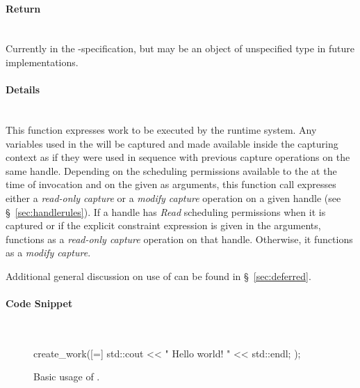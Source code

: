 \paragraph{Return}\mbox{}\\
Currently  in the \specVersion-specification, but may be an object of unspecified
type in future implementations.

\paragraph{Details}\mbox{}\\
This function expresses work to be executed by the \gls{runtime system}.  Any
 variables used in the  will be
captured and made available inside the capturing context as if they were used in
sequence with previous capture operations on the same \gls{handle}.  Depending on the
scheduling permissions available to the  at the time of
 invocation and on the 
given as arguments, this function call expresses either a {\it read-only
capture} or a {\it modify capture} operation on a given \gls{handle} (see
\S~\ref{sec:handlerules}).  If a \gls{handle}  has {\it Read} scheduling
permissions when it is captured or if the explicit constraint expression
 is given in the  arguments,
 functions as a {\it read-only capture} operation on that
\gls{handle}.
Otherwise, it functions as a {\it modify capture}.  

Additional general discussion on use of  can be found in
\S~\ref{sec:deferred}.


\paragraph{Code Snippet}\mbox{}\\
\begin{figure}[!h]
\begin{CppCodeNumb}
create_work([=]{
  std::cout << " Hello world! " << std::endl;
});
\end{CppCodeNumb}
\label{fig:fe_api_cw}
  \caption{Basic usage of \protect{}.}
\end{figure}



